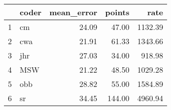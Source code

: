 \begin{table}[ht]
\centering
\begin{tabular}{rlrrr}
  \hline
 & coder & mean\_error & points & rate \\ 
  \hline
1 & cm & 24.09 & 47.00 & 1132.39 \\ 
  2 & cwa & 21.91 & 61.33 & 1343.66 \\ 
  3 & jhr & 27.03 & 34.00 & 918.98 \\ 
  4 & MSW & 21.22 & 48.50 & 1029.28 \\ 
  5 & obb & 28.82 & 55.00 & 1584.89 \\ 
  6 & sr & 34.45 & 144.00 & 4960.94 \\ 
   \hline
\end{tabular}
\end{table}
